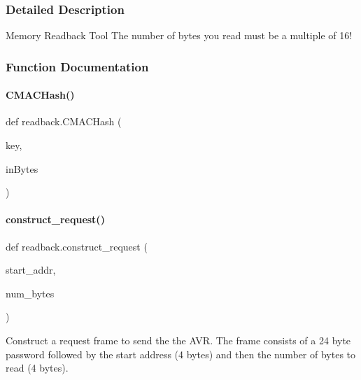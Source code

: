 \subsubsection{Detailed Description}
\begin{DoxyVerb}Memory Readback Tool
The number of bytes you read must be a multiple of 16!
\end{DoxyVerb}
 

\subsubsection{Function Documentation}
\mbox{\label{namespacereadback_a4060e3a940d166a7303d3327c2d6d2c7}} 
\paragraph{\texorpdfstring{C\+M\+A\+C\+Hash()}{CMACHash()}}
{\footnotesize\ttfamily def readback.\+C\+M\+A\+C\+Hash (\begin{DoxyParamCaption}\item[{}]{key,  }\item[{}]{in\+Bytes }\end{DoxyParamCaption})}

\mbox{\label{namespacereadback_ac98f954f8259c56156baf91af488f6cf}} 
\paragraph{\texorpdfstring{construct\+\_\+request()}{construct\_request()}}
{\footnotesize\ttfamily def readback.\+construct\+\_\+request (\begin{DoxyParamCaption}\item[{}]{start\+\_\+addr,  }\item[{}]{num\+\_\+bytes }\end{DoxyParamCaption})}

\begin{DoxyVerb}Construct a request frame to send the the AVR.
The frame consists of a 24 byte password followed by the start address (4
bytes) and then the number of bytes to read (4 bytes).
\end{DoxyVerb}
 \mbox{\label{namespacereadback_a91dbf6b6233274d0eff416f3e56f0edf}} 
